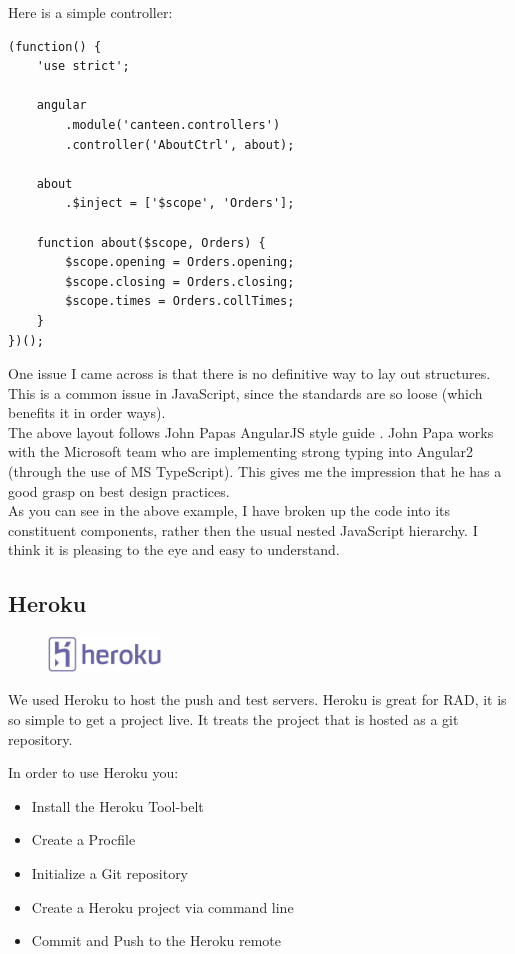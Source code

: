 Here is a simple controller:
\begin{verbatim}
(function() {
    'use strict';

    angular
        .module('canteen.controllers')
        .controller('AboutCtrl', about);

    about
        .$inject = ['$scope', 'Orders'];

    function about($scope, Orders) {
        $scope.opening = Orders.opening;
        $scope.closing = Orders.closing;
        $scope.times = Orders.collTimes;
    }
})();
\end{verbatim}
One issue I came across is that there is no definitive way to lay out structures.
This is a common issue in JavaScript, since the standards are so loose (which benefits it in order ways).
\\

The above layout follows John Papas AngularJS style guide \cite{angular_style_guide}.
John Papa works with the Microsoft team who are implementing strong typing into Angular2 (through the use of MS TypeScript).
This gives me the impression that he has a good grasp on best design practices.
\\

As you can see in the above example, I have broken up the code into its constituent components, rather then the usual nested JavaScript hierarchy.
I think it is pleasing to the eye and easy to understand.

\subsection{Heroku}
\begin{figure}
	\includegraphics[width=3cm]{img/mobile-app/logos/heroku.jpg}
\end{figure} 
We used Heroku \cite{heroku} to host the push and test servers.
Heroku is great for RAD, it is so simple to get a project live.
It treats the project that is hosted as a git repository.

In order to use Heroku you:
\begin{itemize}
	\item Install the Heroku Tool-belt
	\item Create a Procfile
	\item Initialize a Git repository
	\item Create a Heroku project via command line
	\item Commit and Push to the Heroku remote
\end{itemize}

